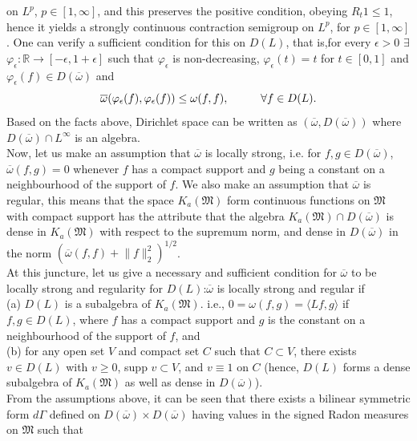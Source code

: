 \documentclass[10pt]{article}
\theoremstyle{definition}
\numberwithin{equation}{section}
\begin{document}
	on $ L^p$, $ p \in [1, \infty] $, and this preserves the positive condition, obeying $R_t 1 \leq 1 $, hence it yields a strongly continuous contraction semigroup on $ L^p$, for $ p \in [1, \infty] $. One can verify a sufficient condition for this on $D(L)$, that is,for every $ \epsilon >0 $ $\exists$ $ \varphi_{\epsilon} : \mathbb{R} \longrightarrow [- \epsilon, 1 + \epsilon]$ such that $ \varphi_{\epsilon}$ is non-decreasing,
$\varphi_{\epsilon} (t) = t $ 	for $ t \in [0,1] $ and $  \varphi_{\epsilon} (f) \in D(\overline{\omega})$ and
 $$\overline{\omega}( \varphi_{\epsilon}(f),  \varphi_{\epsilon}(f)) \leq \omega(f,f), \hspace{1 cm} \forall f \in D(L).$$
	Based on the facts above, Dirichlet space can be written as \textbf{$(\overline{\omega},D(\overline{\omega}))$}  where $D(\overline{\omega}) \cap L^{\infty} $ is an algebra.\\
	Now, let us make an assumption that $ \overline{\omega}$ is locally strong, i.e. for $ f,g \in D(\overline{\omega})$, $ \overline{\omega}(f,g) = 0$  whenever $f$ has a compact support and $g$ being a constant on a neighbourhood of the support of $f$. We also make an assumption that $ \overline{\omega}$ is regular, this means that the space $ K_a (\mathfrak{M})$ form continuous functions on $\mathfrak{M}$ with compact support has the attribute that the algebra $ K_a (\mathfrak{M}) \cap D(\overline{\omega})$ is dense in $ K_a (\mathfrak{M})$ with respect to the supremum  norm, and dense in $D(\overline{\omega})$ in
	the norm $ \left({\overline{\omega}(f,f) + \displaystyle \lVert f \rVert_2 ^2}\right)^{1/2}$.\\
	At this juncture, let us give a necessary and sufficient condition for $\overline{\omega}$ to be locally strong  and regularity for $ D(L)$:$ \overline{\omega}$ is locally strong and regular if\\
	(a) $ D(L)$ is a subalgebra of $ K_a (\mathfrak{M}).$ i.e.,   $0 = \omega (f,g) = \langle Lf,g \rangle$ if $ f,g \in D(L)$, where $f$ has a compact support and $g$ is the constant on a neighbourhood of the support of $f$, and\\
	(b) for any open set $V$ and compact set $C$ such that $ C \subset V $, there exists $ v \in D(L)$ with $ v \geq 0$, supp $ v \subset V$, and $ v \equiv 1$ on $C$ (hence, $D(L)$ forms a dense subalgebra of $ K_a (\mathfrak{M})$ as well as dense in $D(\overline{\omega})$).\\
	From the assumptions above, it can be seen that there exists a bilinear symmetric form $ d\varGamma $ defined on $ D(\overline{\omega}) \times D(\overline{\omega})$ having values in the signed Radon measures on $\mathfrak{M}$ such that
\end{document}

